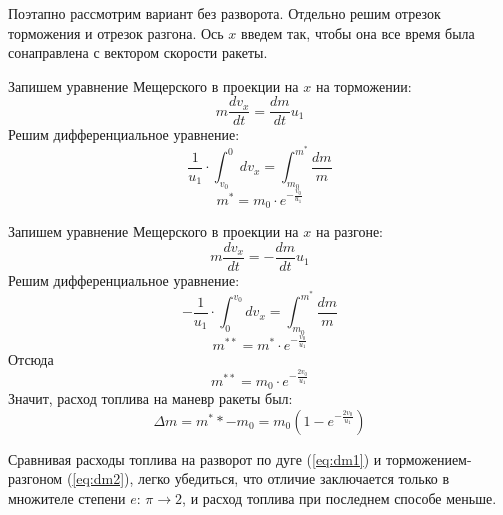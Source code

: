 \documentclass[a5paper,10pt]{article}\usepackage[usenames,dvipsnames]{color}
\begin{document}
Поэтапно рассмотрим вариант без разворота. Отдельно решим отрезок торможения и отрезок разгона. Ось $x$ введем так, чтобы она все время была сонаправлена с вектором скорости ракеты. 

Запишем уравнение Мещерского в проекции на $x$ на торможении:
\begin{equation}
    m \frac{d{v}_x}{dt}=\frac{dm}{dt}{{u}_1}    
\end{equation}
Решим дифференциальное уравнение:
\begin{equation}
    \frac{1}{u_1}\cdot\int_{v_0}^0{d{v}_x}=\int_{m_0}^{m^*}\frac{dm}{m}
\end{equation}
\begin{equation}
    m^*=m_0\cdot e^{-\frac{v_0}{u_1}}
\end{equation}

Запишем уравнение Мещерского в проекции на $x$ на  разгоне:
\begin{equation}
    m \frac{d{v}_x}{dt}=-\frac{dm}{dt}{{u}_1}    
\end{equation}
Решим дифференциальное уравнение:
\begin{equation}
    -\frac{1}{u_1}\cdot\int_{0}^{v_0}{d{v}_x}=\int_{m_0}^{m^*}\frac{dm}{m}
\end{equation}
\begin{equation}
    m^{**}=m^*\cdot e^{-\frac{v_0}{u_1}}
\end{equation}
Отсюда
\begin{equation}
    m^{**}=m_0 \cdot e^{-\frac{2v_0}{u_1}}
\end{equation}
Значит, расход топлива на маневр ракеты был:
\begin{equation}
    \label{eq:dm2}
    \Delta m = m^**-m_0 = m_0(1-e^{-\frac{2 v_0}{u_1}})
\end{equation}

Сравнивая расходы топлива на разворот по дуге (\ref{eq:dm1}) и торможением-разгоном (\ref{eq:dm2}), легко убедиться, что отличие заключается только в множителе степени $e$: $\pi\to2$, и расход топлива при последнем способе меньше.



\end{document}
